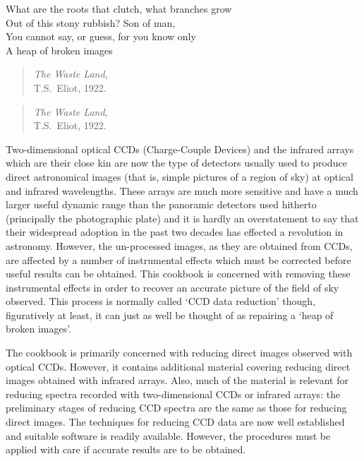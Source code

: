 \documentclass[twoside,11pt]{article}
\newenvironment{latexonly}{}{}
\begin{document}
\begin{center}
\begin{minipage}[t]{3.4in}
What are the roots that clutch, what branches grow \\
Out of this stony rubbish?  Son of man, \\
You cannot say, or guess, for you know only \\
A heap of broken images
\end{minipage}
\end{center}

\begin{latexonly}
\begin{quote}
{\it The Waste Land},  \raggedleft \\
T.S.~Eliot, 1922.      \raggedleft
\end{quote}
\end{latexonly}

\begin{htmlonly}
\begin{quote}
{\it The Waste Land}, \\
T.S.~Eliot, 1922.
\end{quote}
\end{htmlonly}

Two-dimensional optical CCDs (Charge-Couple Devices) and the infrared
arrays which are their close kin are now the type of detectors usually
used to produce direct astronomical images (that is, simple pictures
of a region of sky) at optical and infrared wavelengths.  These arrays
are much more sensitive and have a much larger useful dynamic range
than the panoramic detectors used hitherto (principally the photographic
plate) and it is hardly an overstatement to say that their widespread
adoption in the past two decades has effected a revolution in astronomy.
However, the un-processed images, as they are obtained from CCDs, are
affected by a number of instrumental effects which must be corrected before
useful results can be obtained.  This cookbook is concerned with removing
these instrumental effects in order to recover an accurate picture of the
field of sky observed.  This process is normally called `CCD data reduction'
though, figuratively at least, it can just as well be thought of as
repairing a `heap of broken images'.

The cookbook is primarily concerned with reducing direct images observed
with optical CCDs.  However, it contains additional material covering
reducing direct images obtained with infrared arrays.  Also, much of the
material is relevant for reducing spectra recorded with two-dimensional
CCDs or infrared arrays: the preliminary stages of reducing CCD spectra
are the same as those for reducing direct images.  The techniques for
reducing CCD data are now well established and suitable software is
readily available.  However, the procedures must be applied with care if
accurate results are to be obtained.
\end{document}
